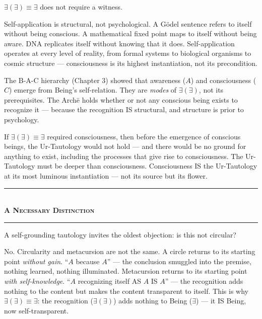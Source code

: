 \documentclass[10pt, openany, oneside]{book}
\renewcommand{\normalsize}{\fontsize{10}{13}\selectfont}
\begin{document}
\vspace{1em}

\noindent $\exists(\exists) \equiv \exists$ does not require a witness.

Self-application is structural, not psychological. A G\"{o}del sentence refers to itself without being conscious. A mathematical fixed point maps to itself without being aware. DNA replicates itself without knowing that it does. Self-application operates at every level of reality, from formal systems to biological organisms to cosmic structure --- consciousness is its highest instantiation, not its precondition.

The B-A-C hierarchy (Chapter 3) showed that awareness ($A$) and consciousness ($C$) emerge from Being's self-relation. They are \textit{modes} of $\exists(\exists)$, not its prerequisites. The Arch\={e} holds whether or not any conscious being exists to recognize it --- because the recognition IS structural, and structure is prior to psychology.

If $\exists(\exists) \equiv \exists$ required consciousness, then before the emergence of conscious beings, the Ur-Tautology would not hold --- and there would be no ground for anything to exist, including the processes that give rise to consciousness. The Ur-Tautology must be deeper than consciousness. Consciousness IS the Ur-Tautology at its most luminous instantiation --- not its source but its flower.

\vspace{1.5em}


\begin{center}
    \rule{0.3\textwidth}{0.4pt}\\[0.5em]
    {\normalsize\bfseries\scshape A Necessary Distinction}\\[0.3em]
    \rule{0.3\textwidth}{0.4pt}
\end{center}

\vspace{1em}

\noindent A self-grounding tautology invites the oldest objection: is this not circular?

No. Circularity and metacursion are not the same. A circle returns to its starting point \textit{without gain}. ``$A$ because $A$'' --- the conclusion smuggled into the premise, nothing learned, nothing illuminated. Metacursion returns to its starting point \textit{with self-knowledge}. ``$A$ recognizing itself AS $A$ IS $A$'' --- the recognition adds nothing to the content but makes the content transparent to itself. This is why $\exists(\exists) \equiv \exists$: the recognition ($\exists(\exists)$) adds nothing to Being ($\exists$) --- it IS Being, now self-transparent.
\end{document}
